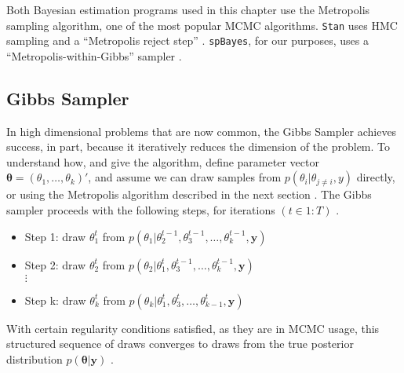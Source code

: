 Both Bayesian estimation programs used in this chapter use the Metropolis sampling algorithm, one of the most popular MCMC algorithms. \verb|Stan| uses HMC sampling and a ``Metropolis reject step'' \citep{STANtheMan}. \verb|spBayes|, for our purposes, uses a ``Metropolis-within-Gibbs'' sampler \citep{Finley2013}.

\subsection{Gibbs Sampler}
In high dimensional problems that are now common, the Gibbs Sampler achieves success, in part, because it iteratively reduces the dimension of the problem. To understand how, and give the algorithm, define parameter vector $\pmb{\theta} = (\theta_{1}, \dots, \theta_{k})'$, and assume we can draw samples from $p(\theta_{i}|\theta_{j \neq i},y)$ directly, or using the Metropolis algorithm described in the next section . The Gibbs sampler proceeds with the following steps, for iterations $(t \in 1:T)$ \citep{Banerjee2014}. 
        \begin{itemize} 
        \item Step 1: draw $\theta_{1}^{t}$ from $p \left( \theta_{1}|\theta_{2}^{t-1}, \theta_{3}^{t-1},\dots,\theta_{k}^{t-1},\pmb{y} \right)$ 
        
        \item Step 2: draw $\theta_{2}^{t}$ from $p \left(\theta_{2}|\theta_{1}^{t}, \theta_{3}^{t-1},\dots,\theta_{k}^{t-1},\pmb{y} \right)$ \\
        $\vdots$ \\ 
        \item Step k: draw $\theta_{k}^{t}$ from $p \left( \theta_{k}|\theta_{1}^{t}, \theta_{3}^{t},\dots,\theta_{k-1}^{t},\pmb{y} \right)$ 
        \end{itemize} 
With certain regularity conditions satisfied, as they are in MCMC usage, this structured sequence of draws converges to draws from the true posterior distribution $p(\pmb{\theta}|\pmb{y})$ \citep{Banerjee2014}. 

